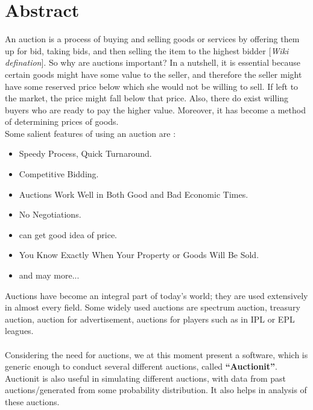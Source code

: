 \documentclass[a4paper]{article}
\begin{document}

% 
\section*{Abstract}




An auction is a process of buying and selling goods or services by offering them up for bid, 
taking bids, and then selling the item to the highest bidder [\textit{Wiki defination}]. 
So why are auctions important? In a nutshell, it is essential because certain goods might have some value to the seller,
and therefore the seller might have some reserved price below which she would not be willing to sell.
If left to the market, the price might fall below that price.
Also, there do exist willing buyers who are ready to pay the higher value.
Moreover, it has become a method of determining prices of goods. \\
Some salient features of using an auction are \cite{vijay}:
\begin{itemize}
    \item Speedy Process, Quick Turnaround.
    \item Competitive Bidding.
    \item Auctions Work Well in Both Good and Bad Economic Times.
    \item No Negotiations.
    \item can get good idea of price.
    \item You Know Exactly When Your Property or Goods Will Be Sold.
    \item and may more...
\end{itemize}
Auctions have become an integral part of today's world; they are used extensively in almost every field. Some widely used auctions are spectrum auction, treasury auction, auction for advertisement, auctions for players such as in IPL or EPL leagues.\\ \\
Considering the need for auctions, we at this moment present a software, which is generic enough to conduct several different auctions, called \textbf{``Auctionit''}. \\
Auctionit is also useful in simulating different auctions, with data from past auctions/generated from some probability distribution. It also helps in analysis of these auctions.
\end{document}
